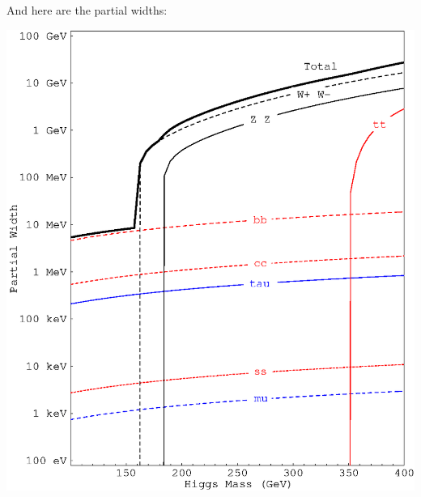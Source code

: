 \documentclass{article}
\begin{document}
\LARGE

\noindent And here are the partial widths:

\vfill

\begin{center}
\includegraphics[width=\linewidth]{higgs_gamma.eps}
\end{center}

\vfill
\end{document}
